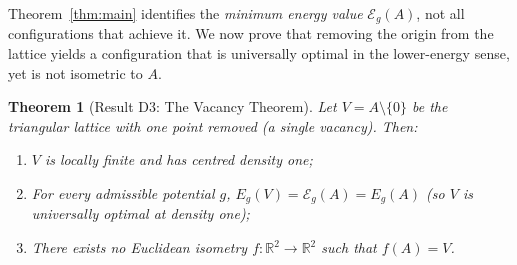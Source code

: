 \documentclass[11pt, a4paper]{article}
\newtheorem{theorem}{Theorem}[section]
\theoremstyle{definition}
\theoremstyle{remark}
\newcommand{\R}{\mathbb{R}}
\newcommand{\Ecal}{\mathcal{E}}
\begin{document}
Theorem~\ref{thm:main} identifies the \textit{minimum energy value} $\Ecal_g(A)$, not all configurations that achieve it. We now prove that removing the origin from the lattice yields a configuration that is universally optimal in the lower-energy sense, yet is not isometric to $A$.

\begin{theorem}[Result D3: The Vacancy Theorem]
\label{thm:vacancy}
Let $V = A \setminus \{0\}$ be the triangular lattice with one point removed (a single vacancy). Then:
\begin{enumerate}[label=(\roman*)]
    \item $V$ is locally finite and has centred density one;
    \item For every admissible potential $g$, $E_g(V) = \Ecal_g(A) = E_g(A)$ (so $V$ is universally optimal at density one);
    \item There exists no Euclidean isometry $f : \R^2 \to \R^2$ such that $f(A) = V$.
\end{enumerate}
\end{theorem}
\end{document}
